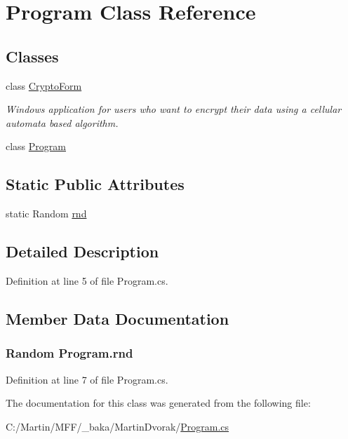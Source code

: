 \hypertarget{class_program}{}\section{Program Class Reference}
\label{class_program}
\subsection*{Classes}
\begin{DoxyCompactItemize}
\item 
class \hyperlink{class_program_1_1_crypto_form}{Crypto\+Form}
\begin{DoxyCompactList}\small\item\em Windows application for users who want to encrypt their data using a cellular automata based algorithm. \end{DoxyCompactList}\item 
class \hyperlink{class_program_1_1_program}{Program}
\end{DoxyCompactItemize}
\subsection*{Static Public Attributes}
\begin{DoxyCompactItemize}
\item 
static Random \hyperlink{class_program_af2ace68664c9d781318def5ce37a7962}{rnd}
\end{DoxyCompactItemize}


\subsection{Detailed Description}


Definition at line 5 of file Program.\+cs.



\subsection{Member Data Documentation}
\hypertarget{class_program_af2ace68664c9d781318def5ce37a7962}{}
\subsubsection[{rnd}]{\setlength{\rightskip}{0pt plus 5cm}Random Program.\+rnd\hspace{0.3cm}{\ttfamily [static]}}\label{class_program_af2ace68664c9d781318def5ce37a7962}


Definition at line 7 of file Program.\+cs.



The documentation for this class was generated from the following file\+:\begin{DoxyCompactItemize}
\item 
C\+:/\+Martin/\+M\+F\+F/\+\_\+baka/\+Martin\+Dvorak/\hyperlink{_martin_dvorak_2_program_8cs}{Program.\+cs}\end{DoxyCompactItemize}
